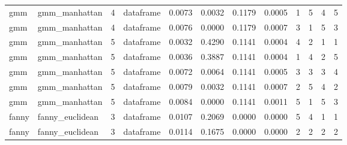 {\begin{longtable}{| p{1cm} | p{1.8cm} | p{0.7cm} | p{0.9cm} | p{0.5cm} | p{0.65cm} | p{0.5cm} | p{0.5cm} | p{0.55cm} | p{0.55cm} | p{0.6cm} | p{0.5cm} |}
\scriptsize     gmm   & \scriptsize    gmm\_manhattan & \scriptsize    4    & \scriptsize dataframe & \scriptsize    0.0073  &  \scriptsize 0.0032 & \scriptsize 0.1179 & \scriptsize    0.0005 & \scriptsize   1  & \scriptsize    5  & \scriptsize    4  & \scriptsize    5 \\
\scriptsize     gmm   & \scriptsize    gmm\_manhattan & \scriptsize    4    & \scriptsize dataframe & \scriptsize    0.0076  &  \scriptsize 0.0000 & \scriptsize 0.1179 & \scriptsize    0.0007 & \scriptsize   3  & \scriptsize    1  & \scriptsize    5  & \scriptsize    3 \\
\cline{3-12}
\scriptsize     gmm   & \scriptsize    gmm\_manhattan & \scriptsize    5    & \scriptsize dataframe & \scriptsize    0.0032  &  \scriptsize 0.4290 & \scriptsize 0.1141 & \scriptsize    0.0004 & \scriptsize   4  & \scriptsize    2  & \scriptsize    1  & \scriptsize    1 \\
\scriptsize     gmm   & \scriptsize    gmm\_manhattan & \scriptsize    5    & \scriptsize dataframe & \scriptsize    0.0036  &  \scriptsize 0.3887 & \scriptsize 0.1141 & \scriptsize    0.0004 & \scriptsize   1  & \scriptsize    4  & \scriptsize    2  & \scriptsize    5 \\
\scriptsize     gmm   & \scriptsize    gmm\_manhattan & \scriptsize    5    & \scriptsize dataframe & \scriptsize    0.0072  &  \scriptsize 0.0064 & \scriptsize 0.1141 & \scriptsize    0.0005 & \scriptsize   3  & \scriptsize    3  & \scriptsize    3  & \scriptsize    4 \\
\scriptsize     gmm   & \scriptsize    gmm\_manhattan & \scriptsize    5    & \scriptsize dataframe & \scriptsize    0.0079  &  \scriptsize 0.0032 & \scriptsize 0.1141 & \scriptsize    0.0007 & \scriptsize   2  & \scriptsize    5  & \scriptsize    4  & \scriptsize    2 \\
\scriptsize     gmm   & \scriptsize    gmm\_manhattan & \scriptsize    5    & \scriptsize dataframe & \scriptsize    0.0084  &  \scriptsize 0.0000 & \scriptsize 0.1141 & \scriptsize    0.0011 & \scriptsize   5  & \scriptsize    1  & \scriptsize    5  & \scriptsize    3 \\
\cline{1-12}
\scriptsize   fanny   & \scriptsize  fanny\_euclidean & \scriptsize    3    & \scriptsize dataframe & \scriptsize    0.0107  &  \scriptsize 0.2069 & \scriptsize 0.0000 & \scriptsize    0.0000 & \scriptsize   5  & \scriptsize    4  & \scriptsize    1  & \scriptsize    1 \\
\scriptsize   fanny   & \scriptsize  fanny\_euclidean & \scriptsize    3    & \scriptsize dataframe & \scriptsize    0.0114  &  \scriptsize 0.1675 & \scriptsize 0.0000 & \scriptsize    0.0000 & \scriptsize   2  & \scriptsize    2  & \scriptsize    2  & \scriptsize    2 \\

\end{longtable}}
